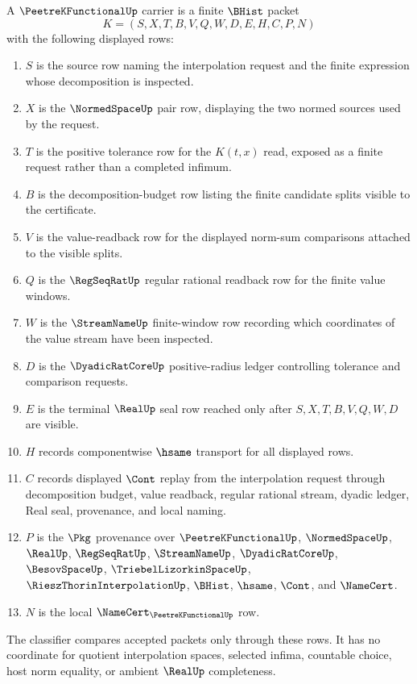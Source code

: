 \begin{definition}
\label{def:peetre-k-functional-carrier}
A $\PeetreKFunctionalUp$ carrier is a finite $\BHist$ packet
$$
K=(S,X,T,B,V,Q,W,D,E,H,C,P,N)
$$
with the following displayed rows:
\begin{enumerate}
\item $S$ is the source row naming the interpolation request and the finite expression whose decomposition is inspected.
\item $X$ is the $\NormedSpaceUp$ pair row, displaying the two normed sources used by the request.
\item $T$ is the positive tolerance row for the $K(t,x)$ read, exposed as a finite request rather than a completed infimum.
\item $B$ is the decomposition-budget row listing the finite candidate splits visible to the certificate.
\item $V$ is the value-readback row for the displayed norm-sum comparisons attached to the visible splits.
\item $Q$ is the $\RegSeqRatUp$ regular rational readback row for the finite value windows.
\item $W$ is the $\StreamNameUp$ finite-window row recording which coordinates of the value stream have been inspected.
\item $D$ is the $\DyadicRatCoreUp$ positive-radius ledger controlling tolerance and comparison requests.
\item $E$ is the terminal $\RealUp$ seal row reached only after $S,X,T,B,V,Q,W,D$ are visible.
\item $H$ records componentwise $\hsame$ transport for all displayed rows.
\item $C$ records displayed $\Cont$ replay from the interpolation request through decomposition budget, value readback, regular rational stream, dyadic ledger, Real seal, provenance, and local naming.
\item $P$ is the $\Pkg$ provenance over $\PeetreKFunctionalUp$, $\NormedSpaceUp$, $\RealUp$, $\RegSeqRatUp$, $\StreamNameUp$, $\DyadicRatCoreUp$, $\BesovSpaceUp$, $\TriebelLizorkinSpaceUp$, $\RieszThorinInterpolationUp$, $\BHist$, $\hsame$, $\Cont$, and $\NameCert$.
\item $N$ is the local $\NameCert_{\PeetreKFunctionalUp}$ row.
\end{enumerate}
The classifier compares accepted packets only through these rows. It has no coordinate for quotient interpolation spaces, selected infima, countable choice, host norm equality, or ambient $\RealUp$ completeness.
\end{definition}

